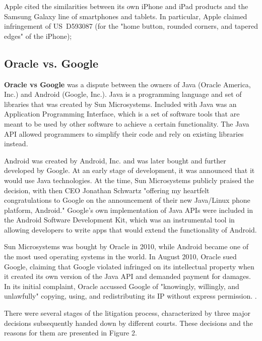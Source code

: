 \documentclass[prodmode,cs196]{acmlarge}
\begin{document}
Apple cited the similarities between its own iPhone and iPad products and the Samsung Galaxy line of smartphones and tablets. In particular, Apple claimed infringement of US D593087 (for the "home button, rounded corners, and tapered edges" of the iPhone); \cite{AppleiPhoneDesignPatent}

\subsection{Oracle vs. Google}

\textbf{Oracle vs Google} was a dispute between the owners of Java (Oracle America, Inc.) and Android (Google, Inc.). Java is a programming language and set of libraries that was created by Sun Microsystems. Included with Java was an Application Programming Interface, which is a set of software tools that are meant to be used by other software to achieve a certain functionality. \cite{Sintes2001} The Java API allowed programmers to simplify their code and rely on existing libraries instead.

Android was created by Android, Inc. and was later bought and further developed by Google. At an early stage of development, it was announced that it would use Java technologies. At the time, Sun Microsystems publicly praised the decision, with then CEO Jonathan Schwartz "offering my heartfelt congratulations to Google on the announcement of their new Java/Linux phone platform, Android." \cite{Schwartz2007} Google's own implementation of Java APIs were included in the Android Software Development Kit, which was an instrumental tool in allowing developers to write apps that would extend the functionality of Android.

Sun Microsystems was bought by Oracle in 2010, while Android became one of the most used operating systems in the world. In August 2010, Oracle sued Google, claiming that Google violated infringed on its intellectual property when it created its own version of the Java API and demanded payment for damages. In its initial complaint, Oracle accussed Google of "knowingly, willingly, and unlawfully" copying, using, and redistributing its IP without express permission. \cite{Bangeman2003}. 

There were several stages of the litigation process, characterized by three major decisions subsequently handed down by different courts. These decisions and the reasons for them are presented in Figure 2.
\end{document}
